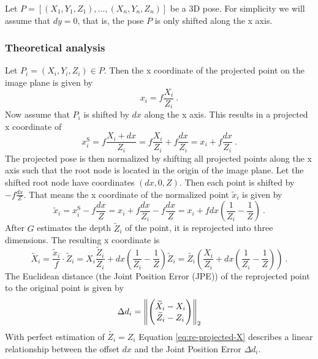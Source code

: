 Let $P = [(X_1, Y_1, Z_1), \dotsc, (X_n, Y_n, Z_n)]$ be a 3D pose.
For simplicity we will assume that $dy = 0$, that is, the pose $P$ is only shifted along the x axis.

\subsubsection{Theoretical analysis}
Let $P_i = (X_i, Y_i, Z_i) \in P$.
Then the x coordinate of the projected point on the image plane is given by
\begin{equation}
	x_i = f \frac{X_i}{Z_i} \ .
\end{equation}
Now assume that $P_i$ is shifted by $dx$ along the x axis.
This results in a projected x coordinate of
\begin{equation}
	x_i^\mathrm{S} = f \frac{X_i + dx}{Z_i} = f \frac{X_i}{Z_i} + f \frac{dx}{Z_i} = x_i + f \frac{dx}{Z_i}\ .
\end{equation}
The projected pose is then normalized by shifting all projected points along the x axis such that the root node is located in the origin of the image plane.
Let the shifted root node have coordinates $(dx, 0, Z)$.
Then each point is shifted by $- f \frac{dx}{Z}$.
That means the x coordinate of the normalized point $\widetilde{x}_i$ is given by
\begin{equation}
	\widetilde{x}_i
	= x_i^\mathrm{S} - f \frac{dx}{Z}
	= x_i + f \frac{dx}{Z_i} - f \frac{dx}{Z}
	= x_i + f dx (\frac{1}{Z_i} - \frac{1}{Z})\ .
\end{equation}
After $G$ estimates the depth $\widetilde{Z}_i$ of the point, it is reprojected into three dimensions. The resulting x coordinate is 
\begin{equation}
	\label{eq:re-projected-X}
	\widetilde{X}_i = \frac{\widetilde{x}_i}{f} \cdot \widetilde{Z}_i
	= X_i \frac{\widetilde{Z}_i}{Z_i} + dx (\frac{1}{Z_i} - \frac{1}{Z}) \widetilde{Z}_i
	= \widetilde{Z_i} \left( \frac{X_i}{Z_i} + dx \left( \frac{1}{Z_i} - \frac{1}{Z} \right) \right ) \ .
\end{equation}
The Euclidean distance (the Joint Position Error (JPE)) of the reprojected point to the original point is given by
\begin{equation}
\label{eq:delta-d}
	\Delta d_i = \norm{ 
	\begin{pmatrix}
		\widetilde{X}_i - X_i \\
		\widetilde{Z}_i - Z_i
	\end{pmatrix}
	}_2
\end{equation}
With perfect estimation of $\widetilde{Z_i} = Z_i$ Equation \eqref{eq:re-projected-X} describes a linear relationship between the offset $dx$ and the Joint Position Error $\Delta d_i$.
